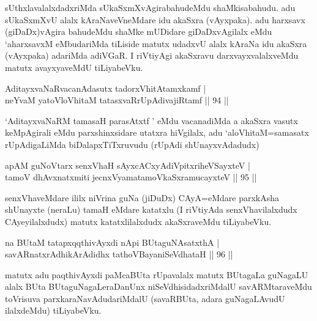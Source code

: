 \begin{artha}
sUthxlavalalxdadxriMda sUkaSxmXvAgirabahudeMdu shaMkisabahudu. adu sUkaSxmXvU alalx kAraNaveVneMdare idu akaSxra (vAyxpaka). adu harxsavx (giDaDx)vAgira bahudeMdu shaMke mUDidare giDaDxvAgilalx eMdu `aharxsavxM eMbudariMda tiLiside matutx udadxvU alalx kAraNa idu akaSxra (vAyxpaka) adariMda adiVGaR. I riVtiyAgi akaSxravu darxvayxvalalxveMdu matutx avayxyaveMdU tiLiyabeVku.
\end{artha}

\begin{shl}
AditayxvaNaRvacanAdasutx tadorxVhitAtamxkamf |\\
neYvaM yatoV\s loVhitaM tatasxvaRrUpAdivajiRtamf \hfill || 94 ||
\end{shl}

\begin{artha}
`AditayxvaNaRM tamasaH parasAtxtf ' eMdu vacanadiMda a akaSxra vasutx keMpAgirali eMdu parxshinxsidare utatxra hiVgilalx, adu `aloVhitaM=samasatx rUpAdigaLiMda biDalapxTiTxruvudu (rUpAdi shUnayxvAdadudx)
\end{artha}


\begin{shl}
apAM guNoV\s tarx senxVhaH sAyxcACxyA\s diVpitxriheVSayxteV  |\\
tamoV dhAvxnatxmiti jecnxVyamatamoV\s kaSxramucayxteV \hfill || 95 ||
\end{shl}

\begin{artha}
senxVhaveMdare ililx niVrina guNa (jiDuDx) CAyA=eMdare parxkAsha shUnayxte (neraLu) tamaH eMdare katatxlu (I riVtiyAda senxVhavilalxdudx CAyeyilalxdudx) matutx katatxlilalxdudx akaSxraveMdu tiLiyabeVku.
\end{artha}

\begin{shl}
na BUtaM tatapxqqthivAyxdi nApi BUtaguNAsatxthA |\\
savARnatxrAdhikArAdidhx tathoVBayaniSeVdhataH \hfill || 96 ||
\end{shl}

\begin{artha}%
matutx adu paqthivAyxdi paMcaBUta rUpavalalx matutx BUtagaLa guNagaLU alalx BUta BUtaguNagaLeraDanUnx niSeVdhisidadxriMdalU savARMtaraveMdu toVrisuva parxkaraNavAdudariMdalU (savaRBUta, adara guNagaLAvudU ilalxdeMdu) tiLiyabeVku.
\end{artha}

